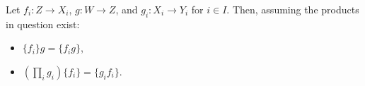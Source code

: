 Let $f_i: Z \to X_i$, $g: W \to Z$, and $g_i: X_i \to Y_i$ for $i \in I$. Then, assuming the products in question exist:
\begin{itemize}
\item[(i)] $\{f_i\} g = \{f_i g\}$,
\item[(ii)] $\left( \prod_i g_i \right) \{f_i\} = \{g_i f_i\}$.
\end{itemize}
